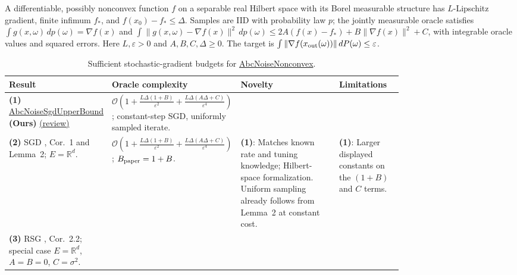 \begin{table}[tp]
\centering
\caption{Sufficient stochastic-gradient budgets for \href{https://github.com/k3nfalt/longtails/blob/main/LongTails/Setups/AbcNoiseNonconvex.lean}{AbcNoiseNonconvex}.}\label{tab:AbcNoiseNonconvex}
\parbox{\linewidth}{\footnotesize A differentiable, possibly nonconvex function $f$ on a separable real Hilbert space with its Borel measurable structure has $L$-Lipschitz gradient, finite infimum $f_*$, and $f(x_0)-f_*\le\Delta$. Samples are IID with probability law $p$; the jointly measurable oracle satisfies $\int g(x,\omega)\,dp(\omega)=\nabla f(x)$ and $\int\|g(x,\omega)-\nabla f(x)\|^2\,dp(\omega)\le 2A(f(x)-f_*)+B\|\nabla f(x)\|^2+C$, with integrable oracle values and squared errors. Here $L,\varepsilon>0$ and $A,B,C,\Delta\ge0$. The target is $\int\|\nabla f(x_{\rm out}(\omega))\|\,dP(\omega)\le\varepsilon$.}\par\smallskip
\begin{threeparttable}
\footnotesize
\setlength{\tabcolsep}{4pt}\renewcommand{\arraystretch}{1.25}
\begin{tabularx}{\linewidth}{@{}>{\raggedright\arraybackslash}p{0.20\linewidth}>{\raggedright\arraybackslash}p{0.32\linewidth}>{\raggedright\arraybackslash}p{0.25\linewidth}>{\raggedright\arraybackslash}X@{}}
\toprule
\textbf{Result} & \textbf{Oracle complexity} & \textbf{Novelty} & \textbf{Limitations} \\
\midrule
\textbf{(1)} \href{https://github.com/k3nfalt/longtails/blob/main/LongTails/Theorems/AbcNoiseSgdUpperBound.lean}{Abc\allowbreak Noise\allowbreak Sgd\allowbreak Upper\allowbreak Bound} \textbf{(Ours)} \href{https://github.com/k3nfalt/longtails/blob/main/scripts/reviews/AbcNoiseSgdUpperBound.md}{(review)}
& $\mathcal{O}\!\left(1+\frac{L\Delta(1+B)}{\varepsilon^2}+\frac{L\Delta(A\Delta+C)}{\varepsilon^4}\right)$; constant-step SGD, uniformly sampled iterate.
& & \\
\midrule[1.2pt]
\textbf{(2)} SGD \citep{avmKhaledRichtarik2020v3}, Cor.~1 and Lemma~2; $E=\mathbb R^d$.
& $\mathcal{O}\!\left(1+\frac{L\Delta(1+B)}{\varepsilon^2}+\frac{L\Delta(A\Delta+C)}{\varepsilon^4}\right)$; $B_{\rm paper}=1+B$.
& \textbf{(1)}: Matches known rate and tuning knowledge; Hilbert-space formalization. Uniform sampling already follows from Lemma~2 at constant cost.
& \textbf{(1)}: Larger displayed constants on the $(1+B)$ and $C$ terms. \\
\midrule
\textbf{(3)} RSG \citep{canGhadimiLan2013}, Cor.~2.2; special case $E=\mathbb R^d$, $A=B=0$, $C=\sigma^2$.

\end{tabularx}
\end{threeparttable}
\end{table}
